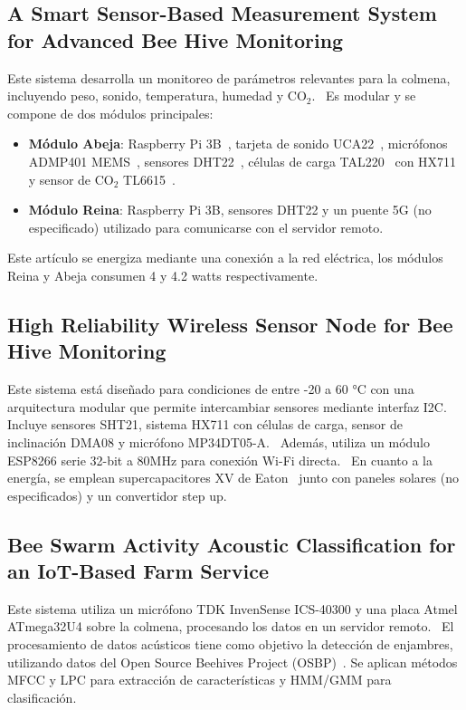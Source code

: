 \subsection{A Smart Sensor-Based Measurement System for Advanced Bee Hive Monitoring}
Este sistema desarrolla un monitoreo de parámetros relevantes para la colmena, incluyendo peso, sonido, temperatura, humedad y CO$_2$.~\cite{cecchi_spinsante_terenzi_orcioni_2020}  
Es modular y se compone de dos módulos principales:  
\begin{itemize}
    \item \textbf{Módulo Abeja}: Raspberry Pi 3B~\cite{buy_raspberry_pi3_model_b}, tarjeta de sonido UCA22~\cite{behringer_uca222}, micrófonos ADMP401 MEMS~\cite{admp401_datasheet}, sensores DHT22~\cite{liu}, células de carga TAL220~\cite{loadcell_tal220_sparkfun} con HX711~\cite{hx711_sparkfun} y sensor de CO$_2$ TL6615~\cite{t6615_telaire}.
    \item \textbf{Módulo Reina}: Raspberry Pi 3B, sensores DHT22 y un puente 5G (no especificado) utilizado para comunicarse con el servidor remoto.~\cite{cecchi_spinsante_terenzi_orcioni_2020}
\end{itemize}  
Este artículo se energiza mediante una conexión a la red eléctrica, los módulos Reina y Abeja consumen 4 y 4.2 watts respectivamente.~\cite{cecchi_spinsante_terenzi_orcioni_2020}

\subsection{High Reliability Wireless Sensor Node for Bee Hive Monitoring}
Este sistema está diseñado para condiciones de entre -20 a 60 °C con una arquitectura modular que permite intercambiar sensores mediante interfaz I2C.~\cite{vidrascu_svasta_vladescu_2016}  
Incluye sensores SHT21, sistema HX711 con células de carga, sensor de inclinación DMA08 y micrófono MP34DT05-A.~\cite{vidrascu_svasta_vladescu_2016}  
Además, utiliza un módulo ESP8266 serie 32-bit a 80MHz para conexión Wi-Fi directa.~\cite{vidrascu_svasta_vladescu_2016}  
En cuanto a la energía, se emplean supercapacitores XV de Eaton~\cite{supercapacitor_xv_eaton} junto con paneles solares (no especificados) y un convertidor step up.~\cite{vidrascu_svasta_vladescu_2016}

\subsection{Bee Swarm Activity Acoustic Classification for an IoT-Based Farm Service}
Este sistema utiliza un micrófono TDK InvenSense ICS-40300 y una placa Atmel ATmega32U4 sobre la colmena, procesando los datos en un servidor remoto.~\cite{zgank_2019}  
El procesamiento de datos acústicos tiene como objetivo la detección de enjambres, utilizando datos del Open Source Beehives Project (OSBP)~\cite{open_source_beehives_project_iaac}. Se aplican métodos MFCC y LPC para extracción de características y HMM/GMM para clasificación.~\cite{zgank_2019}

